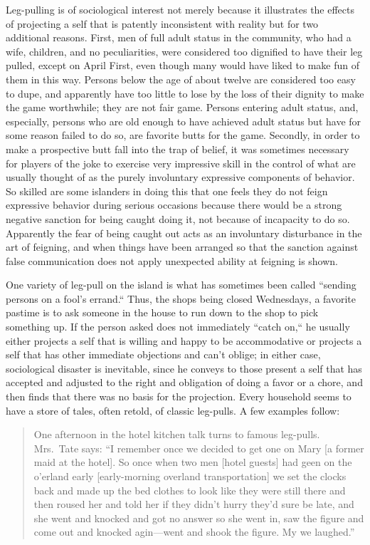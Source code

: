 \documentclass[openany,nobib]{tufte-book}
\begin{document}
Leg-pulling is of sociological interest not merely because it
illustrates the effects of projecting a self that is patently
inconsistent with reality but for two additional reasons. First, men of
full adult status in the community, who had a wife, children, and no
peculiarities, were considered too dignified to have their leg pulled,
except on April First, even though many would have liked to make fun of
them in this way. Persons below the age of about twelve are considered
too easy to dupe, and apparently have too little to lose by the loss of
their dignity to make the game worthwhile; they are not fair game.
Persons entering adult status, and, especially, persons who are old
enough to have achieved adult status but have for some reason failed to
do so, are favorite butts for the game. Secondly, in order to make a
prospective butt fall into the trap of belief, it was sometimes
necessary for players of the joke to exercise very impressive skill in
the control of what are usually thought of as the purely involuntary
expressive components of behavior. So skilled are some islanders in
doing this that one feels they do not feign expressive behavior during
serious occasions because there would be a strong negative sanction for
being caught doing it, not because of incapacity to do so. Apparently
the fear of being caught out acts as an involuntary disturbance in the
art of feigning, and when things have been arranged so that the sanction
against false communication does not apply unexpected ability at
feigning is shown.

One variety of leg-pull on the island is what has sometimes been called
``sending persons on a fool's errand.`` Thus, the shops being closed
Wednesdays, a favorite pastime is to ask someone in the house to run
down to the shop to pick something up. If the person asked does not
immediately ``catch on,`` he usually either projects a self that is
willing and happy to be accommodative or projects a self that has other
immediate objections and can't oblige; in either case, sociological
disaster is inevitable, since he conveys to those present a self that
has accepted and adjusted to the right and obligation of doing a favor
or a chore, and then finds that there was no basis for the projection.
Every household seems to have a store of tales, often retold, of classic
leg-pulls. A few examples follow:

\begin{quote}
One afternoon in the hotel kitchen talk turns to famous leg-pulls.
Mrs.~Tate says: ``I remember once we decided to get one on Mary {[}a
former maid at the hotel{]}. So once when two men {[}hotel guests{]} had
geen on the o'erland early {[}early-morning overland transportation{]}
we set the clocks back and made up the bed clothes to look like they
were still there and then roused her and told her if they didn't hurry
they'd sure be late, and she went and knocked and got no answer so she
went in, saw the figure and come out and knocked agin---went and shook
the figure. My we laughed.''
\end{quote}
\end{document}
